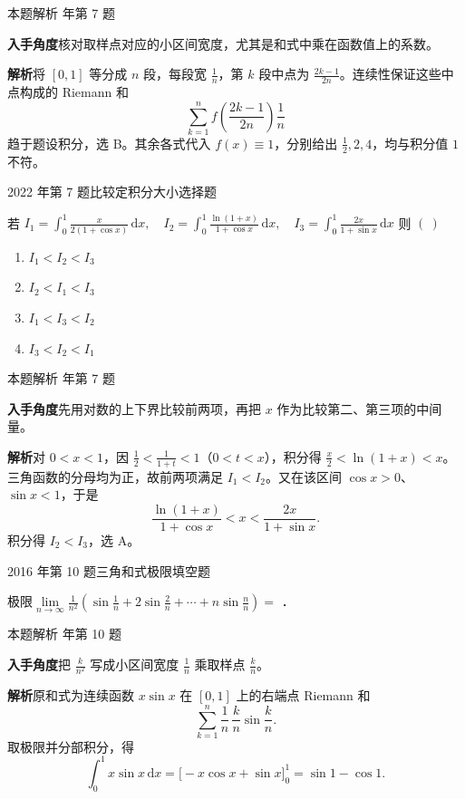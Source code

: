 \documentclass[UTF8,zihao=-4,fontset=fandol]{ctexart}
\renewcommand{\lim}{\operatorname*{lim}\limits}
\newcommand{\blank}{\underline{\hspace{5em}}}
\newenvironment{abcd}{\begin{enumerate}[label=\textup{(\Alph*)},leftmargin=2.3em,itemsep=1pt,topsep=4pt,parsep=1pt]}{\end{enumerate}}
\newcommand{\choices}[4]{%
  \begin{abcd}
    \item #1
    \item #2
    \item #3
    \item #4
  \end{abcd}}
\newcommand{\QuestionPage}[6]{%
  \par\noindent\begin{minipage}{\linewidth}
  \raggedright
  {\small\textcolor{black!60}{#3\quad #5}\hfill\textcolor{accent}{#2}}\par\smallskip}
\newcommand{\QuestionEnd}{\end{minipage}\par\medskip}
\newcommand{\QuestionPage}[6]{%
  \clearpage
  {\small\textcolor{accent}{#1\hfill #2}}\par\medskip
  {\small\textcolor{black!60}{#3\quad #5\hfill #6}}\par\vspace{9bp}}
\newcommand{\QuestionEnd}{}
\newenvironment{QuestionSolution}[1]{%
  \clearpage
  {\small\textcolor{black!60}{本题解析\quad #1}}\par\medskip
}{\par\clearpage}
\begin{document}
\begin{QuestionSolution}{2021 年第 7 题}
\textbf{入手角度}\quad 核对取样点对应的小区间宽度，尤其是和式中乘在函数值上的系数。

\textbf{解析}\quad 将 \([0,1]\) 等分成 \(n\) 段，每段宽 \(\frac{1}{n}\)，第 \(k\) 段中点为 \(\frac{2k-1}{2n}\)。连续性保证这些中点构成的 Riemann 和
\[
\sum_{k=1}^n f\!\left(\frac{2k-1}{2n}\right)\frac1n
\]
趋于题设积分，选 B。其余各式代入 \(f(x)\equiv1\)，分别给出 \(\frac{1}{2},2,4\)，均与积分值 \(1\) 不符。
\end{QuestionSolution}

\QuestionPage{3.1 定积分的概念、存在条件与性质}{选择题}{2022 年第 7 题}{2}{比较定积分大小}{133 / 234}
若
\(I_{1} = \int_{0}^{1} \frac{x}{2\left( 1 + \cos x \right)} \,\mathrm{d}x,\quad I_{2} = \int_{0}^{1} \frac{\ln\left( 1 + x \right)}{1 + \cos x} \,\mathrm{d}x,\quad I_{3} = \int_{0}^{1} \frac{2x}{1 + \sin x} \,\mathrm{d}x\)
则 \(\left( \ \right)\)
\choices{\(I_{1} < I_{2} < I_{3}\)}{\(I_{2} < I_{1} < I_{3}\)}{\(I_{1} < I_{3} < I_{2}\)}{\(I_{3} < I_{2} < I_{1}\)}
\QuestionEnd

\begin{QuestionSolution}{2022 年第 7 题}
\textbf{入手角度}\quad 先用对数的上下界比较前两项，再把 \(x\) 作为比较第二、第三项的中间量。

\textbf{解析}\quad 对 \(0<x<1\)，因 \(\frac{1}{2}<\frac{1}{1+t}<1\)（\(0<t<x\)），积分得 \(\frac{x}{2}<\ln(1+x)<x\)。三角函数的分母均为正，故前两项满足 \(I_1<I_2\)。又在该区间 \(\cos x>0\)、\(\sin x<1\)，于是
\[
\frac{\ln(1+x)}{1+\cos x}<x<\frac{2x}{1+\sin x}.
\]
积分得 \(I_2<I_3\)，选 A。
\end{QuestionSolution}

\QuestionPage{3.1 定积分的概念、存在条件与性质}{填空题}{2016 年第 10 题}{2}{三角和式极限}{134 / 234}
极限$\lim_{n \to \infty} \frac{1}{n^2}\left(\sin\frac{1}{n} + 2\sin\frac{2}{n}
+ \cdots + n\sin\frac{n}{n}\right) =$ \blank{}．
\QuestionEnd

\begin{QuestionSolution}{2016 年第 10 题}
\textbf{入手角度}\quad 把 \(\frac{k}{n^2}\) 写成小区间宽度 \(\frac{1}{n}\) 乘取样点 \(\frac{k}{n}\)。

\textbf{解析}\quad 原和式为连续函数 \(x\sin x\) 在 \([0,1]\) 上的右端点 Riemann 和
\[
\sum_{k=1}^n\frac1n\,\frac{k}{n}\sin\frac{k}{n}.
\]
取极限并分部积分，得
\[
\int_0^1 x\sin x\,\mathrm{d}x
=\bigl[-x\cos x+\sin x\bigr]_0^1
=\boxed{\sin1-\cos1}.
\]
\end{QuestionSolution}
\end{document}
